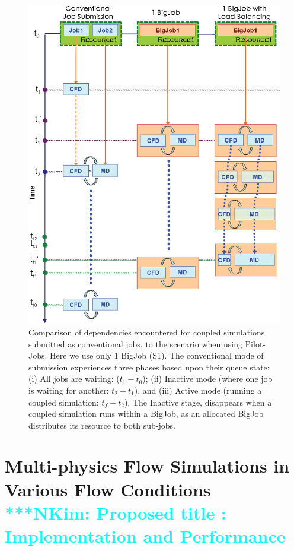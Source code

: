 \documentclass[preprint,12pt]{elsarticle}
\newcommand{\Nkimnote}[1]{ {\textcolor{cyan} { ***NKim: #1 }}}
\newcommand{\Nkimnote}[1]{}
\begin{document}
\begin{figure}
\centering
\includegraphics[width=0.8\linewidth]{Simulation_Time_of_One_BigJob.eps}
\caption{\small Comparison of dependencies encountered for coupled
  simulations submitted as conventional jobs, to the scenario when
  using Pilot-Jobs. Here we use only 1 BigJob (S1). The conventional
  mode of submission experiences three phases based upon their queue
  state: (i) All jobs are waiting: ($t_1-t_0$); (ii) Inactive mode
  (where one job is waiting for another: $t_2-t_1$), and (iii) Active
  mode (running a coupled simulation: $t_f-t_2$). The Inactive stage,
  disappears when a coupled simulation runs within a BigJob, as an
  allocated BigJob distributes its resource to both sub-jobs.}
\label{Fig:OneBJ_Flow}
\vspace{-1em}
\end{figure}



\section{Multi-physics Flow Simulations in Various Flow Conditions
\\
\Nkimnote{Proposed title : Implementation and Performance}}
\end{document}
